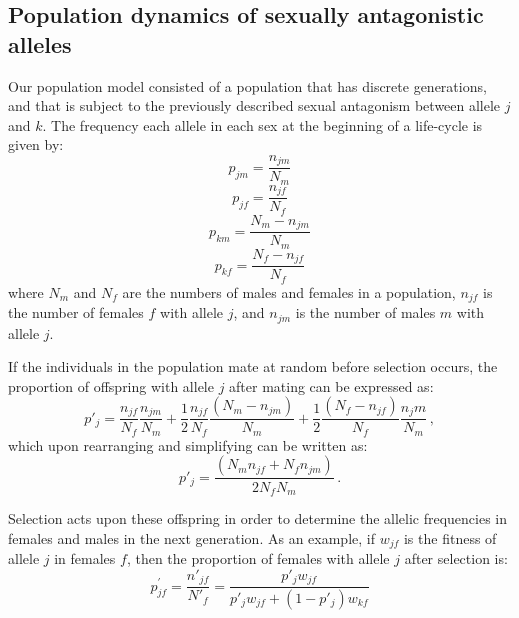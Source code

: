 
\subsection*{Population dynamics of sexually antagonistic alleles}


 Our population model consisted of a population that has discrete generations, and that is subject to the previously described sexual antagonism between allele $j$ and $k$. The frequency each allele in each sex at the beginning of a life-cycle is given by:
\begin{equation}
    p_{jm}= \frac{n_{jm}}{N_{m}}
    \label{first_pop}
\end{equation}
\begin{equation}
    p_{jf}= \frac{n_{jf}}{N_{f}}
\end{equation}
\begin{equation}
    p_{km}= \frac{N_{m}-n_{jm}}{N_{m}}
\end{equation}
\begin{equation}
    p_{kf}= \frac{N_{f}-n_{jf}}{N_{f}}
\end{equation}
where $N_m$ and $N_f$ are the numbers of males and females in a population, $n_{jf}$ is the number of females $f$ with allele $j$, and $n_{jm}$ is the number of males $m$ with allele $j$.

If the individuals in the population mate at random before selection occurs, the proportion of offspring with allele $j$ after mating can be expressed as:
\begin{equation}
   p'_{j}= \frac{n_{jf}}{N_{f}} \frac{n_{jm}}{N_{m}} + \frac{1}{2} \frac{n_{jf}}{N_{f}} \frac{(N_{m}-n_{jm})}{N_{m}} +\frac{1}{2}
   \frac{(N_{f}-n_{jf})}{N_{f}} \frac{n_jm}{N_{m}} \,,
\end{equation}
which upon rearranging and simplifying can be written as:
\begin{equation}
   p'_{j}= \frac{(N_{m}n_{jf}+ N_{f}n_{jm})}{2 N_{f}N_{m}} \,.
   \label{pprime}
\end{equation}

Selection acts upon these offspring in order to determine the allelic frequencies in females and males in the next generation. As an example, if $w_{jf}$ is the fitness of allele $j$ in females $f$, then the proportion of females with allele $j$ after selection is:
\begin{equation}
   p^{\prime}_{jf}= \frac{n'_{jf}}{N'_{f}} = \frac{p'_{j}w_{jf}}{p'_{j}w_{jf}+ (1-p'_{j})w_{kf}}
\end{equation}

